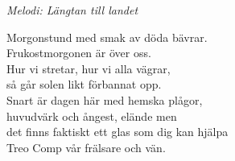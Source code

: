 {\footnotesize\textit{Melodi: Längtan till landet}}\par
\vspace{10pt}
Morgonstund med smak av döda bävrar.\\
Frukostmorgonen är över oss.\\
Hur vi stretar, hur vi alla vägrar,\\
så går solen likt förbannat opp.\\
Snart är dagen här med hemska plågor,\\
huvudvärk och ångest, elände men\\
det finns faktiskt ett glas som dig kan hjälpa\\
Treo Comp vår frälsare och vän.
